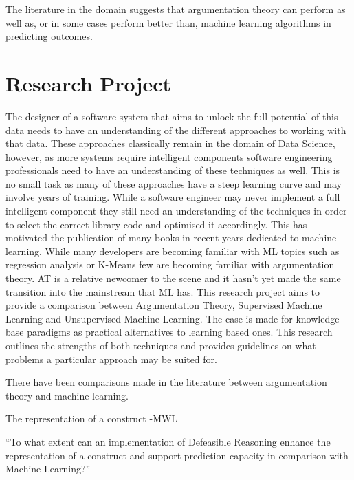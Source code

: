 The literature in the domain suggests that argumentation theory can perform as well as, or in some cases perform better than, machine learning algorithms in predicting outcomes. 





\section{Research Project}


The designer of a software system that aims to unlock the full potential of this data needs to have an understanding of the different approaches to working with that data. These approaches classically remain in the domain of Data Science, however, as more systems require intelligent components software engineering professionals need to have an understanding of these techniques as well. This is no small task as many of these approaches have a steep learning curve and may involve years of training. While a software engineer may never implement a full intelligent component they still need an understanding of the techniques in order to select the correct library code and optimised it accordingly.
This has motivated the publication of many books in recent years dedicated to machine learning. While many developers are becoming familiar with ML topics such as regression analysis or K-Means few are becoming familiar with argumentation theory. AT is a relative newcomer to the scene and it hasn’t yet made the same transition into the mainstream that ML has.
This research project aims to provide a comparison between Argumentation Theory, Supervised Machine Learning and Unsupervised Machine Learning. The case is made for knowledge-base paradigms as practical alternatives to learning based ones. This research outlines the strengths of both techniques and provides guidelines on what problems a particular approach may be suited for.

There have been comparisons made in the literature between argumentation theory and machine learning.


The representation of a construct -MWL

``To what extent can an implementation of Defeasible Reasoning enhance the representation of a construct and support prediction capacity in comparison with Machine Learning?''



